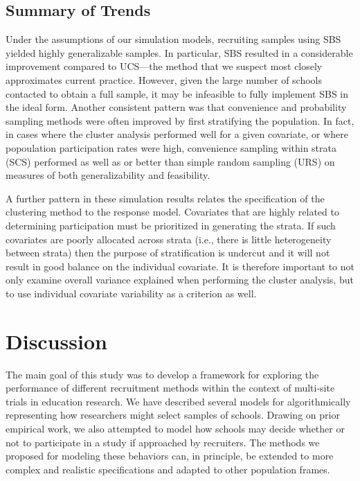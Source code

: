\documentclass[
  english,
  man,floatsintext]{apa6}
\begin{document}
\hypertarget{summary-of-trends}{%
\subsection{Summary of Trends}\label{summary-of-trends}}

Under the assumptions of our simulation models, recruiting samples using SBS yielded highly generalizable samples. In particular, SBS resulted in a considerable improvement compared to UCS---the method that we suspect most closely approximates current practice. However, given the large number of schools contacted to obtain a full sample, it may be infeasible to fully implement SBS in the ideal form. Another consistent pattern was that convenience and probability sampling methods were often improved by first stratifying the population. In fact, in cases where the cluster analysis performed well for a given covariate, or where popoulation participation rates were high, convenience sampling within strata (SCS) performed as well as or better than simple random sampling (URS) on measures of both generalizability and feasibility.

A further pattern in these simulation results relates the specification of the clustering method to the response model. Covariates that are highly related to determining participation must be prioritized in generating the strata. If such covariates are poorly allocated across strata (i.e., there is little heterogeneity between strata) then the purpose of stratification is undercut and it will not result in good balance on the individual covariate. It is therefore important to not only examine overall variance explained when performing the cluster analysis, but to use individual covariate variability as a criterion as well. 

\hypertarget{discussion}{%
\section{Discussion}\label{discussion}}

The main goal of this study was to develop a framework for exploring the performance of different recruitment methods within the context of multi-site trials in education research. We have described several models for algorithmically representing how researchers might select samples of schools. Drawing on prior empirical work, we also attempted to model how schools may decide whether or not to participate in a study if approached by recruiters. The methods we proposed for modeling these behaviors can, in principle, be extended to more complex and realistic specifications and adapted to other population frames.
\end{document}
